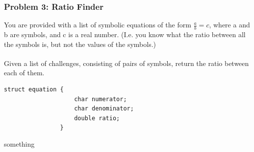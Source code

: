 \documentclass[aspectratio=169]{beamer}
\begin{document}
\begin{frame}[fragile]
    \frametitle{Problem 3: Ratio Finder}
    You are provided with a list of symbolic equations
    of the form \(\frac{a}{b} = c\), where a and b are
    symbols, and c is a real number. (I.e. you know what the ratio
    between all the symbols is, but not the values of the symbols.)
    \\~\\
    Given a list of challenges,
    consisting of pairs of symbols,
    return the ratio between each of them.
        \noindent\begin{minipage}{0.45\textwidth}
            \begin{lstlisting}[frame=tlrb]
                struct equation {
                    char numerator;
                    char denominator;
                    double ratio;
                }
            \end{lstlisting} 
        \end{minipage}\hfill
        \begin{minipage}{0.45\textwidth}
            something

        \end{minipage}


\end{frame}
\end{document}
